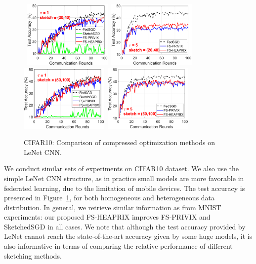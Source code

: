 \documentclass{article}
\begin{document}
\begin{figure}[H]
\begin{center}
{	
		\mbox{\hspace{-0.15in}	
		\includegraphics[width=1.7in]{CIFAR_figures/cifar_local1_sketch20_iid0_test_acc.eps}  \hspace{-0.12in}
		\includegraphics[width=1.7in]{CIFAR_figures/cifar_local5_sketch20_iid0_test_acc.eps}
		\includegraphics[width=1.7in]{CIFAR_figures/cifar_local1_sketch50_iid0_test_acc.eps}\hspace{-0.12in}
		\includegraphics[width=1.7in]{CIFAR_figures/cifar_local5_sketch50_iid0_test_acc.eps}
		}
		}
	\end{center}
	\vspace{-0.1in}
	\caption{CIFAR10: Comparison of compressed optimization methods on LeNet CNN.}
    \label{fig:CIFAR}
\end{figure}

We conduct similar sets of experiments on CIFAR10 dataset. We also use the simple LeNet CNN structure, as in practice small models are more favorable in federated learning, due to the limitation of mobile devices. The test accuracy is presented in Figure~\ref{fig:CIFAR}, for both homogeneous and heterogeneous data distribution. In general, we retrieve similar information as from MNIST experiments: our proposed FS-HEAPRIX improves FS-PRIVIX and SketchedSGD in all cases. We note that although the test accuracy provided by LeNet cannot reach the state-of-the-art accuracy given by some huge models, it is also informative in terms of comparing the relative performance of different sketching methods.
\end{document}
